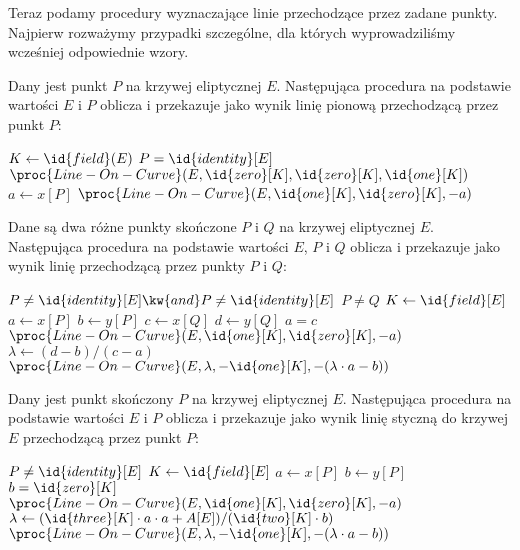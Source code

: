 \noindent
Teraz podamy procedury wyznaczające linie przechodzące przez zadane punkty.
Najpierw rozważymy przypadki szczególne,
dla których wyprowadziliśmy wcześniej odpowiednie wzory.

\begin{algorithm}
Dany jest punkt $P$ na krzywej eliptycznej $E$.
Następująca procedura
na podstawie wartości $E$ i $P$
oblicza i przekazuje jako wynik
linię pionową przechodzącą przez punkt $P$:

\begin{codebox}
\li $K \gets \id{field}(E)$
\li \If $P = \id{identity}[E]$
\li     \Then
            \Return $\proc{Line-On-Curve}(E, \id{zero}[K], \id{zero}[K], \id{one}[K])$
\li     \Else
            $a \gets x[P]$
\li         \Return $\proc{Line-On-Curve}(E, \id{one}[K], \id{zero}[K], -a)$
        \End
\end{codebox}
\end{algorithm}

\begin{algorithm}
Dane są dwa różne punkty skończone $P$ i $Q$ na krzywej eliptycznej $E$.
Następująca procedura
na podstawie wartości $E$, $P$ i $Q$
oblicza i przekazuje jako wynik
linię przechodzącą przez punkty $P$ i $Q$:

\begin{codebox}
\li \Assert $P \neq \id{identity}[E] \kw{ and } P \neq \id{identity}[E]$
\li \Assert $P \neq Q$
\li $K \gets \id{field}[E]$
\li $a \gets x[P]$
\li $b \gets y[P]$
\li $c \gets x[Q]$
\li $d \gets y[Q]$
\li \If $a = c$
\li     \Then
            \Return $\proc{Line-On-Curve}(E, \id{one}[K], \id{zero}[K], -a)$
\li     \Else
            $\lambda \gets (d-b)/(c-a)$
\li         \Return $\proc{Line-On-Curve}(E, \lambda, -\id{one}[K], -(\lambda\cdot a - b))$
        \End
\end{codebox}
\end{algorithm}

\begin{algorithm}
Dany jest punkt skończony $P$ na krzywej eliptycznej $E$.
Następująca procedura
na podstawie wartości $E$ i $P$
oblicza i przekazuje jako wynik
linię styczną do krzywej $E$ przechodzącą przez punkt $P$:

\begin{codebox}
\li \Assert $P \neq \id{identity}[E]$
\li $K \gets \id{field}[E]$
\li $a \gets x[P]$
\li $b \gets y[P]$
\li \If $b = \id{zero}[K]$
\li     \Then
            \Return $\proc{Line-On-Curve}(E, \id{one}[K], \id{zero}[K], -a)$
\li     \Else
            $\lambda \gets (\id{three}[K]\cdot a \cdot a + A[E])/(\id{two}[K]\cdot b)$
\li         \Return $\proc{Line-On-Curve}(E, \lambda, -\id{one}[K], -(\lambda\cdot a - b))$
        \End
\end{codebox}
\end{algorithm}

